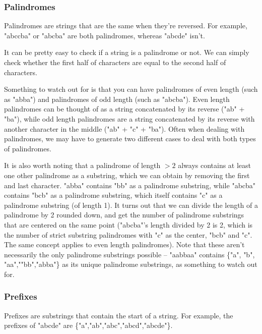\subsubsection{Palindromes}

Palindromes are strings that are the same when they're reversed. For example, "abccba" or "abcba" are both palindromes, whereas "abcde" isn't.

It can be pretty easy to check if a string is a palindrome or not. We can simply check whether the first half of characters are equal to the second half of characters.


Something to watch out for is that you can have palindromes of even length (such as "abba") and palindromes of odd length (such as "abcba"). Even length palindromes can be thought of as a string concatenated by its reverse ("ab" + "ba"), while odd length palindromes are a string concatenated by its reverse with another character in the middle ("ab" + "c" + "ba"). Often when dealing with palindromes, we may have to generate two different cases to deal with both types of palindromes.

It is also worth noting that a palindrome of length $> 2$ always contains at least one other palindrome as a substring, which we can obtain by removing the first and last character. "abba" contains "bb" as a palindrome substring, while "abcba" contains "bcb" as a palindrome substring, which itself contains "c" as a palindrome substring (of length 1). It turns out that we can divide the length of a palindrome by 2 rounded down, and get the number of palindrome substrings that are centered on the same point ("abcba"'s length divided by 2 is 2, which is the number of strict substring palindromes with "c" as the center, "bcb" and "c". The same concept applies to even length palindromes). Note that these aren't necessarily the only palindrome substrings possible -- "aabbaa" contains \{"a", "b", "aa",""bb","abba"\} as its unique palindrome substrings, as something to watch out for.

\subsubsection{Prefixes}

Prefixes are substrings that contain the start of a string. For example, the prefixes of "abcde" are \{"a","ab","abc","abcd","abcde"\}.

